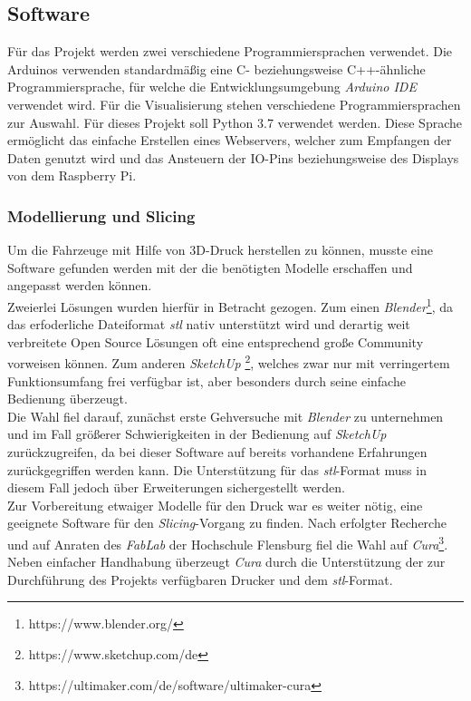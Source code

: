 \documentclass[.../Dokumentation.tex]{subfiles}
\begin{document}
\subsection{Software}\label{sec-components-software}
Für das Projekt werden zwei verschiedene Programmiersprachen verwendet. 
Die Arduinos verwenden standardmäßig eine C- beziehungsweise C++-ähnliche 
Programmiersprache, für welche die Entwicklungsumgebung 
\textit{Arduino IDE} verwendet wird. 
Für die Visualisierung stehen verschiedene Programmiersprachen zur Auswahl. 
Für dieses Projekt soll Python 3.7 verwendet werden. Diese Sprache 
ermöglicht das einfache Erstellen eines Webservers, welcher zum Empfangen 
der Daten genutzt wird und das Ansteuern der IO-Pins beziehungsweise des 
Displays von dem Raspberry Pi.

\subsubsection{Modellierung und Slicing}\label{sec-components-software-model}
Um die Fahrzeuge mit Hilfe von 3D-Druck herstellen zu können, musste eine 
Software gefunden werden mit der die benötigten Modelle erschaffen und angepasst 
werden können.\\
Zweierlei Lösungen wurden hierfür in Betracht gezogen.
Zum einen \textit{Blender}\footnote{https://www.blender.org/},
da das erfoderliche Dateiformat 
\textit{stl} nativ unterstützt wird und derartig weit verbreitete Open 
Source Lösungen oft eine entsprechend große Community vorweisen können.
Zum anderen \textit{SketchUp} \footnote{https://www.sketchup.com/de},
welches zwar nur mit verringertem 
Funktionsumfang frei verfügbar ist, aber besonders durch seine einfache 
Bedienung überzeugt.\\
Die Wahl fiel darauf, zunächst erste Gehversuche mit \textit{Blender} 
zu unternehmen und im Fall größerer Schwierigkeiten in der Bedienung auf 
\textit{SketchUp} zurückzugreifen, da bei dieser Software auf bereits 
vorhandene Erfahrungen zurückgegriffen werden kann. 
Die Unterstützung für das \textit{stl}-Format 
muss in diesem Fall jedoch über Erweiterungen sichergestellt werden.\\
Zur Vorbereitung etwaiger Modelle für den Druck war es weiter nötig, 
eine geeignete Software für den \textit{Slicing}-Vorgang zu finden.
Nach erfolgter Recherche und auf Anraten des \textit{FabLab} der Hochschule 
Flensburg fiel die Wahl auf 
\textit{Cura}\footnote{https://ultimaker.com/de/software/ultimaker-cura}.
Neben einfacher Handhabung überzeugt \textit{Cura} durch die Unterstützung 
der zur Durchführung des Projekts verfügbaren Drucker und dem 
\textit{stl}-Format.
\end{document}
